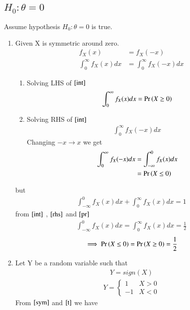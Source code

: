 \documentclass[journal,12pt,twocolumn]{IEEEtran}
\begin{document}
\subsection{$H_0:\theta=0$}
Assume hypothesis
$H_0:\theta=0$ is true.
\begin{enumerate}
\item Given X is symmetric around zero.
 \begin{align}
  f_X(x)&=f_X(-x)\\
  \int_{0}^{\infty}f_X(x)dx&=\int_{0}^{\infty}f_X(-x)dx
  \label{int}
\end{align}
\begin{enumerate}
\item Solving LHS of $\eqref{int}$
\begin{align}
    \int_{0}^{\infty}f_X(x)dx=\Pr\left(X\geq0\right)
\end{align}
\item Solving RHS of $\eqref{int}$
\begin{align}
    \int_{0}^{\infty}f_X(-x)dx
\end{align}
Changing $-x \rightarrow x$ we get 
\begin{align}
  \int_{0}^{\infty}f_X(-x)dx&=\int_{-\infty}^{0}f_X(x)dx\label{rhs}\\
  &=\Pr\left(X\leq0\right)
\end{align}
\end{enumerate}
but
\begin{align}
  \int_{-\infty}^{0}f_X(x)dx+\int_{0}^{\infty}f_X(x)dx=1
  \label{pr}
\end{align}
from $\eqref{int}$ , $\eqref{rhs}$ and $\eqref{pr}$
\begin{align}
\int_{-\infty}^{0}f_X(x)dx=\int_{0}^{\infty}f_X(x)dx=\frac{1}{2}
\end{align}
\begin{align}
    \implies \Pr\left(X\leq 0\right)=\Pr\left(X\geq0\right)=\frac{1}{2}
    \label{sym}
\end{align}
\item Let Y be a random variable such that
\begin{align}
    Y=sign(X)
\end{align}
\begin{align}
    Y=
    \begin{cases}
     1 & X>0\\
    -1 & X<0
    \end{cases}
    \label{t}
\end{align}
From $\eqref{sym}$ and $\eqref{t}$
we have
\begin{align}

\end{align}
\end{enumerate}
\end{document}
